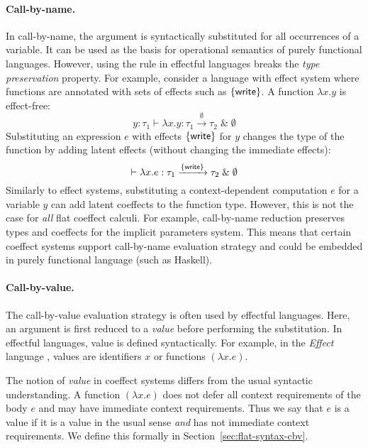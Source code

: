 \paragraph{Call-by-name.} 
In call-by-name, the argument is syntactically substituted for all occurrences of a variable. It
can be used as the basis for operational semantics of purely functional languages. However, using
the rule in effectful languages breaks the \emph{type preservation} property. For example, consider
a language with effect system where functions are annotated with sets of effects such as $\{ \textnormal{\sffamily write} \}$.
A function $\lambda x.y$ is effect-free:
%
\begin{equation*}
y\!:\!\tau_1 \vdash \lambda x.y : \tau_1 \xrightarrow{\emptyset} \tau_2 \;\&\; \emptyset
\end{equation*}
%
Substituting an expression $e$ with effects $\{ \textnormal{\sffamily write} \}$ for $y$ changes the type of 
the function by adding latent effects (without changing the immediate effects):
%
\begin{equation*}
\vdash \lambda x.e : \tau_1 \xrightarrow{ \{ \textnormal{\sffamily write} \} } \tau_2 \;\&\; \emptyset
\end{equation*}
%
Similarly to effect systems, substituting a context-dependent computation $e$ for a variable $y$ can
add latent coeffects to the function type. However, this is not the case for \emph{all} flat coeffect
calculi. For example, call-by-name reduction preserves types and coeffects for the implicit 
parameters system. This means that certain coeffect systems support call-by-name evaluation strategy
and could be embedded in purely functional language (such as Haskell).

\paragraph{Call-by-value.}

The call-by-value evaluation strategy is often used by effectful languages. Here, an argument is
first reduced to a \emph{value} before performing the substitution. In effectful languages, 
value is defined syntactically. For example, in the \emph{Effect} language \cite{monads-effects-marriage},
values are identifiers $x$ or functions $(\lambda x.e)$.

The notion of \emph{value} in coeffect systems differs from the usual syntactic understanding.
A function $(\lambda x.e)$ does not defer all context requirements of the body $e$ and may have
immediate context requirements. Thus we say that $e$ is a value if it is a value in the usual
sense \emph{and} has not immediate context requirements. We define this formally in 
Section~\ref{sec:flat-syntax-cbv}.

